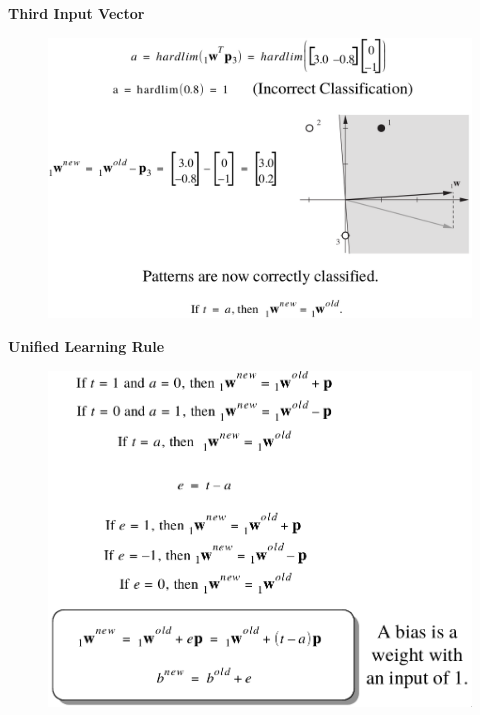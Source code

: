 \documentclass[10pt, compress]{beamer}
\begin{document}
\begin{frame}
  \vspace{1cm}
  \textbf{Third Input Vector}
  \begin{figure}
    \includegraphics[width=.9\linewidth]{imgs/perceptron_ex_5}
  \end{figure}
\end{frame}

\begin{frame}
  \vspace{.5cm}
  \textbf{Unified Learning Rule}
  \begin{figure}
    \includegraphics[width=.9\linewidth]{imgs/perceptron_ex_6}
  \end{figure}
\end{frame}
\end{document}

